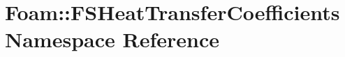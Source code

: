 \hypertarget{namespaceFoam_1_1FSHeatTransferCoefficients}{}\section{Foam\+:\+:F\+S\+Heat\+Transfer\+Coefficients Namespace Reference}
\label{namespaceFoam_1_1FSHeatTransferCoefficients}
